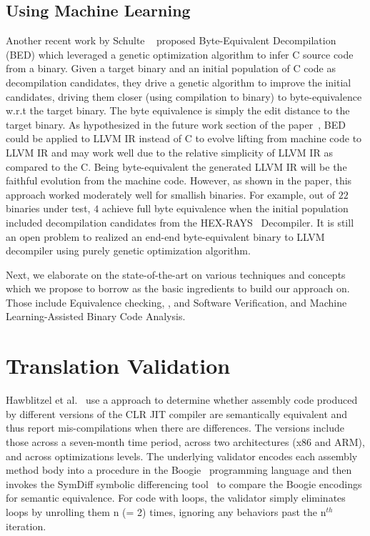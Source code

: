 \subsection{Using Machine Learning} Another recent work by Schulte
\etal~\cite{eschulte2018bed} proposed Byte-Equivalent Decompilation (BED) which
leveraged a genetic optimization algorithm to infer C source code from a
binary. Given a target binary and an initial population of C code as
decompilation candidates, they  drive a genetic algorithm to improve the
initial candidates, driving them closer (using compilation to binary) to
byte-equivalence w.r.t the target binary. The byte equivalence  is simply the
edit distance to the target binary. As hypothesized in the future work section
of the paper~\cite{eschulte2018bed}, BED could be applied to LLVM IR instead of
C to evolve lifting from machine code to LLVM IR and may work well due to the
relative simplicity of LLVM IR as compared to the C. Being byte-equivalent the
generated LLVM IR will be the faithful evolution from the machine code.
However, as shown in the paper, this approach worked moderately well for
smallish binaries. For example, out of $22$ binaries under test,  $4$ achieve full byte equivalence when the initial
    population included decompilation candidates from the
    HEX-RAYS~\cite{hexray} Decompiler. It is still an open problem to realized
    an end-end byte-equivalent binary to LLVM decompiler using purely genetic
    optimization algorithm. 


Next, we elaborate on the state-of-the-art on various techniques and concepts
which we propose to borrow as the basic ingredients to build our approach on. Those
include Equivalence checking, \TV, and Software Verification, and Machine Learning-Assisted Binary Code Analysis.

\section{Translation Validation}

Hawblitzel et al.~\cite{Hawblitzel:FSE2013} use a \tv approach to determine
whether assembly code produced by different versions of the CLR JIT compiler
are semantically equivalent and thus report mis-compilations when there are
differences. The versions include those across a seven-month time period,
  across two architectures (x86 and ARM), and across optimizations levels. The
  underlying validator encodes each assembly method body into a procedure in
  the Boogie~\cite{Boogie:2005}  programming language and then invokes the
  SymDiff symbolic differencing tool~\cite{SYMDIFF:2012} to compare the Boogie
  encodings for semantic equivalence. For code with loops, the validator simply
  eliminates loops by unrolling them n (= 2) times, ignoring any behaviors past
  the n$^{th}$ iteration.
 
